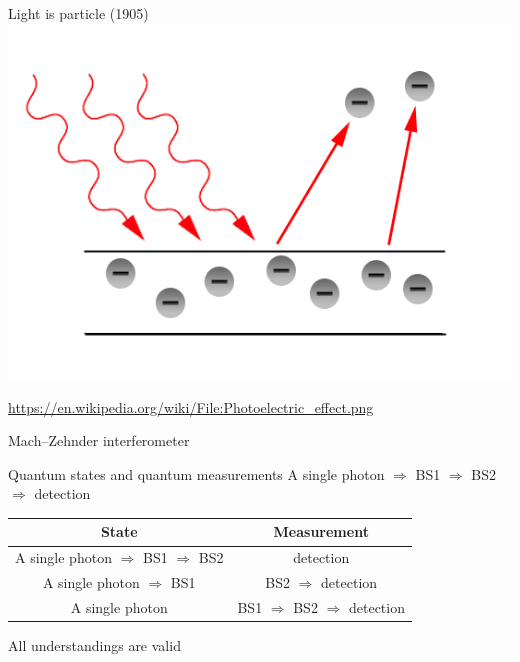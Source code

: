 \documentclass{beamer}
\theoremstyle{definition}
\begin{document}
\begin{frame}{Light is particle (1905)}
\includegraphics[width=0.6\hsize]{Photoelectric_effect.png}

\vfill
\scriptsize\url{https://en.wikipedia.org/wiki/File:Photoelectric_effect.png}
\end{frame}

\begin{frame}{Mach--Zehnder interferometer}
\centering
{}
\end{frame}


\begin{frame}{Quantum states and quantum measurements}
\centering
A single photon $\Rightarrow$ BS1 $\Rightarrow$ BS2 $\Rightarrow$ detection

\vspace{2em}
\begin{tabular}{|c|c|}
\hline
State & Measurement \\
\hline
A single photon $\Rightarrow$ BS1 $\Rightarrow$ BS2 & detection\\
A single photon $\Rightarrow$ BS1 & BS2 $\Rightarrow$ detection\\
A single photon & BS1 $\Rightarrow$ BS2 $\Rightarrow$ detection\\
\hline
\end{tabular}

\vspace{5em}
\Large
All understandings are valid
\end{frame}
\end{document}
